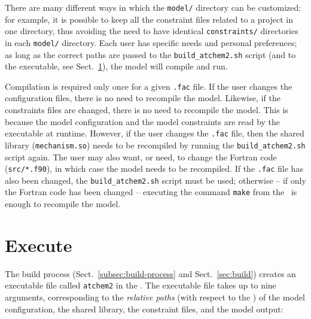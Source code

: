 There are many different ways in which the \texttt{model/} directory
can be customized: for example, it is possible to keep all the
constraint files related to a project in one directory, thus avoiding
the need to have identical \texttt{constraints/} directories in each
\texttt{model/} directory. Each user has specific needs and personal
preferences; as long as the correct paths are passed to the
\texttt{build\_atchem2.sh} script (and to the executable, see
Sect.~\ref{sec:execute}), the model will compile and run.

Compilation is required only once for a given \texttt{.fac} file. If
the user changes the configuration files, there is no need to
recompile the model. Likewise, if the constraints files are changed,
there is no need to recompile the model. This is because the model
configuration and the model constraints are read by the executable at
runtime. However, if the user changes the \texttt{.fac} file, then the
shared library (\texttt{mechanism.so}) needs to be recompiled by
running the \texttt{build\_atchem2.sh} script again. The user may also
want, or need, to change the Fortran code (\texttt{src/*.f90}), in
which case the model needs to be recompiled. If the \texttt{.fac} file
has also been changed, the \texttt{build\_atchem2.sh} script must be
used; otherwise -- if only the Fortran code has been changed --
executing the command \verb|make| from the \maindir\ is enough to
recompile the model.

\section{Execute} \label{sec:execute}

The build process (Sect.~\ref{subsec:build-process} and
Sect.~\ref{sec:build}) creates an executable file called
\texttt{atchem2} in the \maindir. The executable file takes up to nine
arguments, corresponding to the \emph{relative paths} (with respect to
the \maindir) of the model configuration, the shared library, the
constraint files, and the model output:

